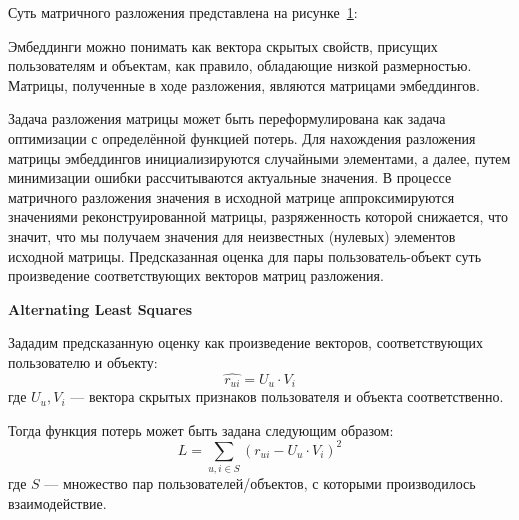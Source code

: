 Суть матричного разложения представлена на рисунке~\ref{fig:mf}:
\begin{figure}[h!]
\caption{}
\label{fig:mf}
\end{figure}

Эмбеддинги можно понимать как вектора скрытых свойств, присущих пользователям и объектам, как правило, обладающие низкой размерностью.
Матрицы, полученные в ходе разложения, являются матрицами эмбеддингов.

Задача разложения матрицы может быть переформулирована как задача оптимизации с определённой функцией потерь.
Для нахождения разложения матрицы эмбеддингов инициализируются случайными элементами, а далее, путем минимизации ошибки рассчитываются актуальные значения.
В процессе матричного разложения значения в исходной матрице аппроксимируются значениями реконструированной матрицы, разряженность которой снижается, что значит, что мы получаем значения для неизвестных (нулевых) элементов исходной матрицы.
Предсказанная оценка для пары пользователь-объект суть произведение соответствующих векторов матриц разложения.

\vspace{1em}
\textbf{Alternating Least Squares}


Зададим предсказанную оценку как произведение векторов, соответствующих пользователю и объекту:
\begin{equation}\label{eq:1}
    \hat{r_{ui}} = U_{u} \cdot V_{i}
\end{equation}
где $U_{u}, V_{i}$ --- вектора скрытых признаков пользователя и объекта соответственно.

Тогда функция потерь может быть задана следующим образом:
\begin{equation}\label{eq:2}
        L = \sum_{u, i\in S}{(r_{ui} - U_{u} \cdot V_{i}) ^ 2}
\end{equation}
где $S$ --- множество пар пользователей/объектов, с которыми производилось взаимодействие.


